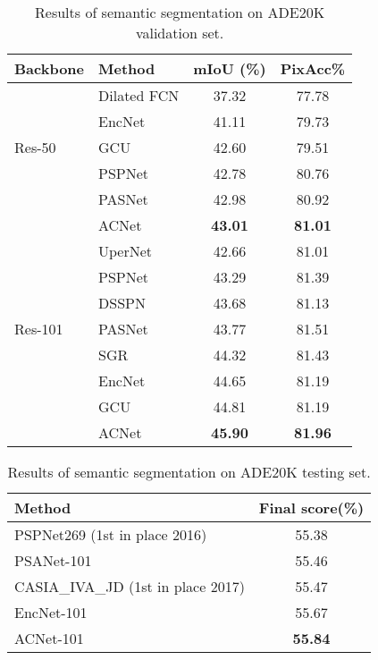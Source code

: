 \documentclass[10pt,twocolumn,letterpaper]{article}
\begin{document}
\begin{table}[t]
\begin{center}
\begin{tabular}{l|l |c| c}
\toprule
Backbone & Method & mIoU (\%)& PixAcc\%\\
\hline
\hline
\multirow{5}{*}{Res-50}&Dilated FCN & 37.32 & 77.78 \\
&EncNet\cite{encnet}  & 41.11& 79.73 \\
&GCU\cite{li2018beyond}&42.60&79.51\\
&PSPNet\cite{pspnet}  & 42.78 & 80.76 \\
&PASNet\cite{zhao2018psanet}  & 42.98 & 80.92 \\
&ACNet  & \textbf{43.01} & \textbf{81.01} \\
\hline
\multirow{7}{*}{Res-101}&UperNet\cite{xiao2018unified} &42.66&81.01\\
&PSPNet\cite{pspnet}  & 43.29 & 81.39\\
&DSSPN\cite{liang2018dynamic}  & 43.68 & 81.13 \\
&PASNet\cite{zhao2018psanet}  & 43.77& 81.51\\
&SGR \cite{liang2018symbolic}&44.32&81.43\\
&EncNet\cite{encnet}  & 44.65 & 81.19\\
&GCU\cite{li2018beyond}&44.81&81.19\\
&ACNet  & \textbf{45.90} & \textbf{81.96} \\
\hline
\bottomrule
\end{tabular}
\end{center}
\caption{Results of semantic segmentation on
ADE20K validation set.  }
\vspace{-1.2em}
\label{ADE20kv}
\end{table}


\begin{table}[t]
\begin{center}
\begin{tabular}{l| c}
\toprule
Method & Final score(\%)\\
\hline
\hline
 \noalign{\smallskip}
PSPNet269 (1st in place 2016)& 55.38\\
PSANet-101\cite{zhao2018psanet} & 55.46\\
CASIA\_IVA\_JD (1st in place 2017)& 55.47\\
EncNet-101 \cite{encnet} & 55.67\\
ACNet-101 &  \textbf{55.84}\\
\hline
\bottomrule
\end{tabular}
\end{center}
\caption{Results of semantic segmentation on
ADE20K testing set.  }
\vspace{-1.2em}
\label{ADE20kt}
\end{table}
\end{document}
